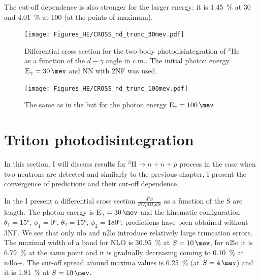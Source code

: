     The cut-off dependence is also stronger for the larger energy:
    it is  \SI{1.45}{\percent} at \SI{30}{\mev} and \SI{4.01}{\percent} at \SI{100}{\mev}
    (at the points of maximum). 

\begin{figure}[h]
    \begin{center}
        \texttt{[image: Figures\_HE/CROSS\_nd\_trunc\_30mev.pdf]}
        \end{center}
        \caption{Differential cross section for the
        two-body photodisintegration of $^3$He as a function of the $d-\gamma$ angle in c.m..
        The initial photon energy $\text{E}_\gamma=\SI{30}{\mev}$ and NN with 2NF was used.}
        \label{CROSS_nd_30}
    \end{figure}


    \begin{figure}[h]
        \begin{center}
        \texttt{[image: Figures\_HE/CROSS\_nd\_trunc\_100mev.pdf]}
        \end{center}
        \caption{The same as in the  but 
        for the photon energy E$_\gamma=\SI{100}{\mev}$}
        \label{CROSS_nd_100}
    \end{figure}

    \clearpage
\section{Triton photodisintegration}
    \label{sec:triton_results}
    
    
    In this section, I will discuss results for $^3\text{H} \rightarrow n + n + p$ process in the case when two neutrons are detected 
    and similarly to the previous chapter, I present the convergence of predictions 
    and their cut-off dependence. 

    In the  I present a differential cross section 
    $\frac{d^5\sigma}{d\Omega_1d\Omega_2dS}$ as a function of the S arc length.
    The photon energy is  E$_\gamma=\SI{30}{\mev}$ and the kinematic configuration
    $\theta_1 = \ang{15}$, $\phi_1 = \ang{0}$,
    $\theta_2 = \ang{15}$, $\phi_2 = \ang{180}$; predictions have been obtained without 3NF.
    We see that only \gls{nlo} and \gls{n2lo} introduce relatively large truncation errors.
    The maximal width of a band for NLO is \SI{30.95}{\percent} at $S=\SI{10}{\mev}$,
    for \gls{n2lo} it is \SI{6.79}{\percent} at the same point and it is gradually decreasing
    coming to \SI{0.10}{\percent} at \gls{n4lo+}.
    The cut-off spread around maxima values is \SI{6.25}{\percent} (at $S=\SI{4}{\mev}$) and it is
    \SI{1.81}{\percent} at $S=\SI{10}{\mev}$.

